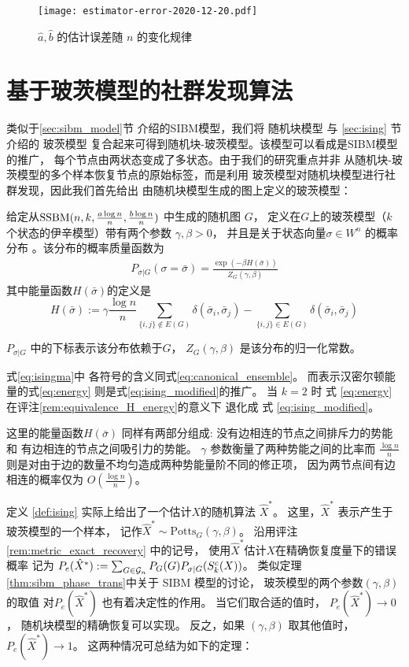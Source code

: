\begin{figure}[ht!]
	\centering
		\texttt{[image: estimator-error-2020-12-20.pdf]}
		\caption{ $\hat{a}, \hat{b}$ 的估计误差随
		$n$ 的变化规律 }\label{fig:estimator}
\end{figure}

\section{基于玻茨模型的社群发现算法}
类似于\ref{sec:sibm_model}节
介绍的SIBM模型，我们将
随机块模型
与 \ref{sec:ising} 节介绍的 玻茨模型
复合起来可得到随机块-玻茨模型。该模型可以看成是SIBM模型的推广，
每个节点由两状态变成了多状态。由于我们的研究重点并非
从随机块-玻茨模型的多个样本恢复节点的原始标签，而是利用
玻茨模型对随机块模型进行社群发现，因此我们首先给出
由随机块模型生成的图上定义的玻茨模型：
\begin{definition}\label{def:ising}
	给定从$\operatorname{SSBM}(n,k,\frac{a \log n}{n},\frac{b \log n}{n})$ 中生成的随机图 $G$，
    定义在$G$上的玻茨模型（$k$个状态的伊辛模型）带有两个参数 $\gamma,\beta>0$，
	并且是关于状态向量$\sigma\in W^n$ 的概率分布
。该分布的概率质量函数为
\begin{align} \label{eq:isingma}
	P_{\sigma|G}(\sigma=\bar{\sigma})=\frac{\exp(-\beta H(\bar{\sigma}))}{Z_G(\gamma,\beta)}
	\end{align}
其中能量函数$H(\bar{\sigma})$的定义是
\begin{equation}\label{eq:energy}
	H(\bar{\sigma}) := \gamma \frac{\log n}{n} \sum_{\{i,j\}\not\in E(G)} \delta(\bar{\sigma}_i, \bar{\sigma}_j)
	- \sum_{\{i,j\}\in E(G)} \delta(\bar{\sigma}_i, \bar{\sigma}_j)
	\end{equation}
	
	$P_{\sigma|G}$ 中的下标表示该分布依赖于$G$，
    $Z_G(\gamma,\beta)$ 是该分布的归一化常数。
\end{definition}

式\eqref{eq:isingma}中
各符号的含义同式\eqref{eq:canonical_ensemble}。
而表示汉密尔顿能量的式\eqref{eq:energy}
则是式\eqref{eq:ising_modified}的推广。
当  $k=2$ 时 式 \eqref{eq:energy}
在评注\ref{rem:equivalence_H_energy}的意义下
退化成 式 \eqref{eq:ising_modified}。 

这里的能量函数$H(\bar{\sigma})$ 同样有两部分组成:
没有边相连的节点之间排斥力的势能和
有边相连的节点之间吸引力的势能。
$\gamma$ 参数衡量了两种势能之间的比率而
$\frac{\log n}{n}$ 则是对由于边的数量不均匀造成两种势能量阶不同的修正项，
因为两节点间有边相连的概率仅为 $O(\frac{\log n}{n})$。

定义 \ref{def:ising} 实际上给出了一个估计$X$的随机算法 $\hat{X}^*$。
这里，$\hat{X}^*$ 表示产生于玻茨模型的一个样本，
记作$\hat{X}^* \sim \textrm{Potts}_G(\gamma, \beta)$。
沿用评注\ref{rem:metric_exact_recovery} 中的记号，
使用$\hat{X}^*$估计$X$在精确恢复度量下的错误概率
记为 $P_e(\hat{X}^*) := \sum_{G \in \mathcal{G}_n} P_G(G) P_{\sigma | G}(S^c_k(X))$。
类似定理\ref{thm:sibm_phase_trans}中关于 SIBM 模型的讨论，
玻茨模型的两个参数$(\gamma, \beta)$ 的取值
对$P_e(\hat{X}^*)$
也有着决定性的作用。
当它们取合适的值时， 
$ P_e(\hat{X}^*)\to 0$，
随机块模型的精确恢复可以实现。
反之，如果 $(\gamma, \beta)$ 取其他值时，
$P_e(\hat{X}^*) \to 1$。
这两种情况可总结为如下的定理：

